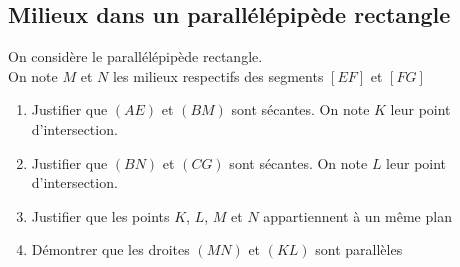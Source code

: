 \documentclass[oneside,12pt]{book}          %
\begin{document}
\subsection{Milieux dans un parallélépipède rectangle}
On considère le parallélépipède rectangle.\\
On note $M$ et $N$ les milieux respectifs des segments $[EF]$ et $[FG]$
\begin{enumerate}
    \item Justifier que $(AE)$ et $(BM)$ sont sécantes. On note $K$ leur point d'intersection.
    \item Justifier que $(BN)$ et $(CG)$ sont sécantes. On note $L$ leur point d'intersection.
    \item Justifier que les points $K$, $L$, $M$ et $N$ appartiennent à un même plan
    \item Démontrer que les droites $(MN)$ et $(KL)$ sont parallèles
\end{enumerate}
\end{document}
